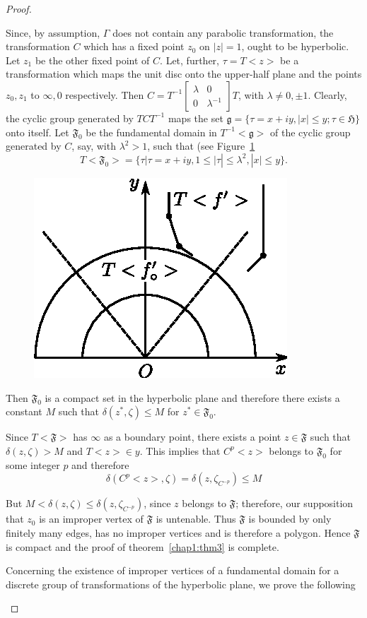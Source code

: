 \begin{proof}
\begin{enumerate}
Since, by assumption, $\Gamma$ does not contain any parabolic
transformation, the transformation $C$ which has a fixed point $z_0$
on $|z|=1$, ought to be hyperbolic. Let $z_1$ be the other fixed point
of $C$. Let, further, $\tau=T<z>$ be a transformation which maps the
unit disc onto the upper-half plane and the points $z_0,z_1$ to
$\infty, 0$ respectively. Then $C=T^{-1} \begin{bmatrix}
\lambda & 0 \\
0 & \lambda^{-1}\end{bmatrix}T$, with $\lambda \neq 0, \pm
1$. Clearly, the cyclic group generated by $TCT^{-1}$ maps the set
$\mathfrak{g} = \{\tau = x + iy,|x| \leq y ; \tau \in
\mathfrak{H}\}$ onto itself. Let $\mathfrak{F}_0$ be the fundamental
domain in $T^{-1}<\mathfrak{g}>$ of the cyclic group generated by $C$,
say, with $\lambda^2>1$, such that (see Figure~\ref{chap1:fig9}
$$
T <\mathfrak{F}_0> = \{\tau | \tau = x+ iy, 1 \leq |\tau| \leq
\lambda^2, |x| \leq y\}.
$$

\begin{figure}[H]
\centering
\includegraphics{vol29-fig/fig29-9.eps}
\smallskip
\caption{}
\label{chap1:fig9}
\end{figure}

Then $\mathfrak{F}_0$ is a compact set in the hyperbolic plane and
therefore there exists a constant $M$ such that $\delta(z^{\ast},
\zeta) \leq M$ for $z^{\ast} \in \mathfrak{F}_0$.

Since $T<\mathfrak{F}>$ has $\infty$ as a boundary point, there exists
a point $z\in \mathfrak{F}$ such that $\delta (z,\zeta)>M$ and
$T<z>\in y$. This implies that $C^p<z>$  belongs to
$\mathfrak{F}_0$ for some integer $p$  and therefore 
$$
\delta (C^p <z>, \zeta) = \delta (z,\zeta_{C^{-p}}) \leq M
$$

But $M<\delta(z,\zeta) \leq \delta (z,\zeta_{C^{-p}})$, since $z$
belongs to $\mathfrak{F}$; therefore, our supposition \pageoriginale
that $z_0$ is an improper vertex of $\mathfrak{F}$ is untenable. Thus
$\mathfrak{F}$ is bounded by only finitely many edges, has no improper
vertices and is therefore a polygon. Hence $\mathfrak{F}$ is compact
and the proof of theorem~\ref{chap1:thm3} is complete. 

Concerning the existence of improper vertices of a fundamental domain
for a discrete group of transformations of the hyperbolic plane, we
prove the following
\end{enumerate}
\end{proof}

